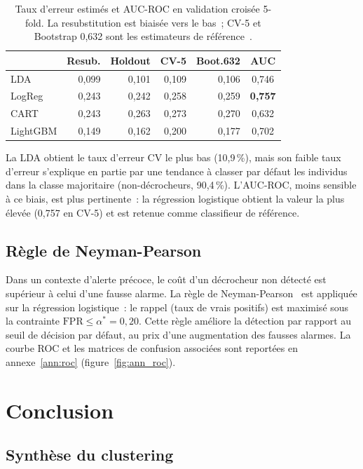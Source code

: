 \documentclass[twocolumn]{article}
\begin{document}
\begin{table}[h]
\caption{Taux d'erreur estimés et AUC-ROC en validation croisée 5-fold. La resubstitution est biaisée vers le bas~; CV-5 et Bootstrap 0,632 sont les estimateurs de référence~\cite[Ch.\,13]{polySY09}.}
\label{tab:classifieurs}
\centering
\footnotesize
\begin{tabular}{lrrrrc}
\toprule
 & Resub. & Holdout & CV-5 & Boot.632 & AUC \\
\midrule
LDA      & 0,099 & 0,101 & 0,109 & 0,106 & 0,746 \\
LogReg   & 0,243 & 0,242 & 0,258 & 0,259 & \textbf{0,757} \\
CART     & 0,243 & 0,263 & 0,273 & 0,270 & 0,632 \\
LightGBM & 0,149 & 0,162 & 0,200 & 0,177 & 0,702 \\
\bottomrule
\end{tabular}
\end{table}

La LDA obtient le taux d'erreur CV le plus bas (10,9\,\%), mais son faible taux d'erreur s'explique en partie par une tendance à classer par défaut les individus dans la classe majoritaire (non-décrocheurs, 90,4\,\%). L'AUC-ROC, moins sensible à ce biais, est plus pertinente~: la régression logistique obtient la valeur la plus élevée (0,757 en CV-5) et est retenue comme classifieur de référence.

\subsection{Règle de Neyman-Pearson}

Dans un contexte d'alerte précoce, le coût d'un décrocheur non détecté est supérieur à celui d'une fausse alarme. La règle de Neyman-Pearson~\cite[Ch.\,9]{polySY09} est appliquée sur la régression logistique~: le rappel (taux de vrais positifs) est maximisé sous la contrainte $\text{FPR} \leq \alpha^* = 0{,}20$. Cette règle améliore la détection par rapport au seuil de décision par défaut, au prix d'une augmentation des fausses alarmes. La courbe ROC et les matrices de confusion associées sont reportées en annexe~\ref{ann:roc} (figure~\ref{fig:ann_roc}).

\section{Conclusion}

\subsection{Synthèse du clustering}
\end{document}
